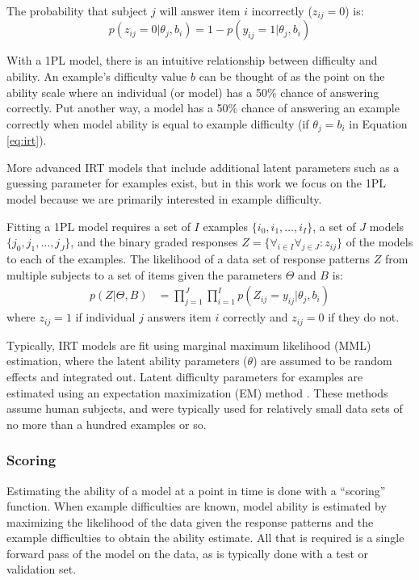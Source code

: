 \documentclass[letterpaper]{article} %
\begin{document}
The probability that subject $j$ will answer item $i$ incorrectly ($z_{ij}=0$) is:
\begin{equation} 
p(z_{ij} = 0 | \theta_j, b_i) = 1 - p(y_{ij} = 1 \vert \theta_j, b_i)
\end{equation} 

With a 1PL model, there is an intuitive relationship between difficulty and ability.
An example's difficulty value $b$ can be thought of as the point on the ability scale where an individual (or model) has a 50\% chance of answering correctly.
Put another way, a model has a 50\% chance of answering an example correctly when model ability is equal to example difficulty (if $\theta_j = b_i$ in Equation \ref{eq:irt}).

More advanced IRT models that include additional latent parameters such as a guessing parameter for examples exist, but in this work we focus on the 1PL model because we are primarily interested in example difficulty.

Fitting a 1PL model requires a set of $I$ examples $\{i_0, i_1, \dots, i_I\}$, a set of $J$ models $\{j_0, j_1, \dots, j_J\}$, and the binary graded responses $Z = \{\forall_{i \in I} \forall_{j \in J}: z_{ij}\}$ of the models to each of the examples.
The likelihood of a data set of response patterns $Z$ from multiple subjects to a set of items given the parameters $\Theta$ and $B$ is:
\begin{align} 
p(Z \vert \Theta, B) &= \prod_{j=1}^J \prod_{i=1}^I p(Z_{ij}=y_{ij} \vert \theta_j, b_i)
\end{align} 
where $z_{ij} = 1$ if individual $j$ answers item $i$ correctly and $z_{ij} = 0$ if they do not.

Typically, IRT models are fit using marginal maximum likelihood (MML) estimation, where the latent ability parameters ($\theta$) are assumed to be random effects and integrated out.
Latent difficulty parameters for examples are estimated using an expectation maximization (EM) method \cite{bock_marginal_1981}.
These methods assume human subjects, and were typically used for relatively small data sets of no more than a hundred examples or so.

\subsubsection{Scoring}
\label{ssec:scoring}
Estimating the ability of a model at a point in time is done with a ``scoring'' function. 
When example difficulties are known, model ability is estimated by maximizing the likelihood of the data given the response patterns and the example difficulties to obtain the ability estimate.
All that is required is a single forward pass of the model on the data, as is typically done with a test or validation set. 
\end{document}

